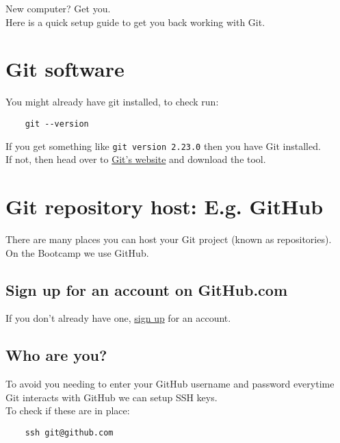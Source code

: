 New computer? Get you.
\\

Here is a quick setup guide to get you back working with Git.
\\

\section{Git software}

You might already have git installed, to check run:

\begin{verbatim}
    git --version
\end{verbatim}

If you get something like \texttt{git version 2.23.0} then you have Git installed.
\\

If not, then head over to \href{https://git-scm.com/}{Git's website} and download the tool.

\section{Git repository host: E.g. GitHub}

There are many places you can host your Git project (known as repositories).
\\

On the Bootcamp we use GitHub.

\subsection{Sign up for an account on GitHub.com}

If you don't already have one, \href{https://github.com/join}{sign up} for an account.
\\

\subsection{Who are you?}

To avoid you needing to enter your GitHub username and password everytime Git interacts with GitHub we can setup SSH keys.
\\

To check if these are in place:

\begin{verbatim}
    ssh git@github.com
\end{verbatim}

